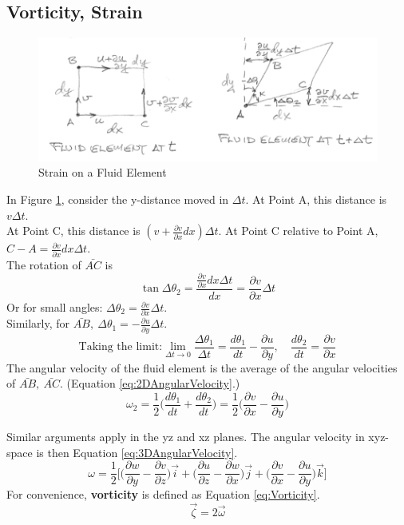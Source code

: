 \documentclass[draft=false, titlepage]{article}
\newcommand{\partialfrac}[2]{\frac{\partial #1}{\partial #2}}
\begin{document}
 \subsection{Vorticity, Strain}
 \begin{figure}[ht]
     \centering
     \includegraphics[width=0.9\linewidth]{Figures/VorticityStrain.PNG}
     \caption{Strain on a Fluid Element}
     \label{fig:VorticityStrain}
 \end{figure}
 In Figure \ref{fig:VorticityStrain}, consider the y-distance moved in $\Delta t$.
 At Point A, this distance is $v \Delta t$.\\
 At Point C, this distance is $(v + \partialfrac{v}{x}dx) \Delta t$.
 At Point C relative to Point A, $C-A = \partialfrac{v}{x}dx \Delta t$.\\
 The rotation of $\bar{AC}$ is
 \begin{equation*}
     \tan\Delta \theta_2 = \frac{\partialfrac{v}{x}dx \Delta t}{dx}= \partialfrac{v}{x}\Delta t
 \end{equation*}
 Or for small angles: $\Delta \theta_2 = \partialfrac{v}{x} \Delta t$.\\
 Similarly, for $\bar{AB},\
    \Delta \theta_1 = -\partialfrac{u}{y} \Delta t$.
\begin{equation*}
    \text{Taking the limit:} \lim\limits_{\Delta t\rightarrow 0} \frac{\Delta \theta_1}{\Delta t} =
    \frac{d\theta_1}{dt} - \partialfrac{u}{y},\quad \frac{d\theta_2}{dt} = \partialfrac{v}{x}
\end{equation*}
The angular velocity of the fluid element is the average of the angular velocities of $\bar{AB},\ \bar{AC}$. (Equation \ref{eq:2DAngularVelocity}.)
\begin{equation}
    \omega_2 = \frac{1}{2}\Big( \frac{d\theta_1}{dt} + \frac{d\theta_2}{dt} \Big) = \frac{1}{2}\Big(\partialfrac{v}{x} - \partialfrac{u}{y} \Big)
    \label{eq:2DAngularVelocity}
\end{equation}

Similar arguments apply in the yz and xz planes. The angular velocity in xyz-space is then Equation \ref{eq:3DAngularVelocity}.
\begin{equation}
    \omega = \frac{1}{2}\Bigg[ \Big( \partialfrac{w}{y} - \partialfrac{v}{z} \Big)\vec{i}
    + \Big( \partialfrac{u}{z} - \partialfrac{w}{x} \Big)\vec{j}
    + \Big( \partialfrac{v}{x} - \partialfrac{u}{y} \Big)\vec{k} \Bigg]
    \label{eq:3DAngularVelocity}
\end{equation}
For convenience, \textbf{vorticity} is defined as Equation \ref{eq:Vorticity}.
\begin{equation}
    \vec{\zeta} = 2\vec{\omega} %
    \label{eq:Vorticity}
\end{equation}
\end{document}
